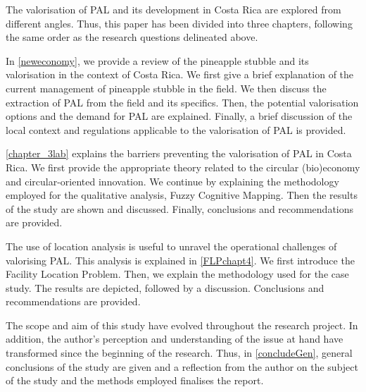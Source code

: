 The valorisation of PAL and its development in Costa Rica are explored from different angles. Thus, this paper has been divided into three chapters, following the same order as the research questions delineated above.

In \cref{neweconomy}, we provide a review of the pineapple stubble and its valorisation in the context of Costa Rica. We first give a brief explanation of the current management of pineapple stubble in the field. We then discuss the extraction of PAL from the field and its specifics. Then, the potential valorisation options and the demand for PAL are explained. Finally, a brief discussion of the local context and regulations applicable to the valorisation of PAL is provided.

\cref{chapter_3lab} explains the barriers preventing the valorisation of PAL in Costa Rica. We first provide the appropriate theory related to the circular (bio)economy and circular-oriented innovation. We continue by explaining the methodology employed for the qualitative analysis, Fuzzy Cognitive Mapping. Then the results of the study are shown and discussed. Finally, conclusions and recommendations are provided. 

The use of location analysis is useful to unravel the operational challenges of valorising PAL. This analysis is explained in \cref{FLPchapt4}. We first introduce the Facility Location Problem. Then, we explain the methodology used for the case study. The results are depicted, followed by a discussion. Conclusions and recommendations are provided. 

The scope and aim of this study have evolved throughout the research project. In addition, the author's perception and understanding of the issue at hand have transformed since the beginning of the research. Thus, in \cref{concludeGen}, general conclusions of the study are given and a reflection from the author on the subject of the study and the methods employed finalises the report. 

